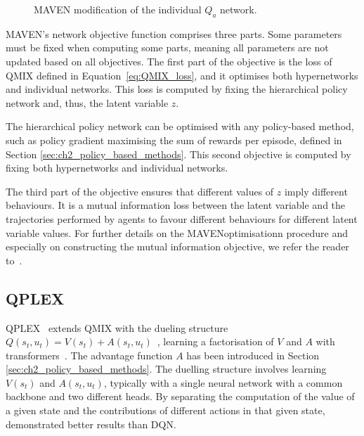 \begin{figure}
\centering

\caption{MAVEN modification of the individual $Q_a$ network.}
\label{fig:maven}
\end{figure}

MAVEN's network objective function comprises three parts.
Some parameters must be fixed when computing some parts, meaning all parameters are not updated based on all objectives.
The first part of the objective is the loss of QMIX defined in Equation~\ref{eq:QMIX_loss}, and it optimises both hypernetworks and individual networks.
This loss is computed by fixing the hierarchical policy network and, thus, the latent variable $z$.

The hierarchical policy network can be optimised with any policy-based method, such as policy gradient maximising the sum of rewards per episode, defined in Section \ref{sec:ch2_policy_based_methods}.
This second objective is computed by fixing both hypernetworks and individual networks.

The third part of the objective ensures that different values of $z$ imply different behaviours. 
It is a mutual information loss between the latent variable and the trajectories performed by agents to favour different behaviours for different latent variable values.
For further details on the MAVENoptimisationn procedure and especially on constructing the mutual information objective, we refer the reader to~\cite{Mahajan2019MAVEN:Exploration}.

\subsection{QPLEX}
QPLEX~\citep{wang2021qplex} extends QMIX with the dueling structure $Q(s_t, u_t) = V(s_t) + A(s_t, u_t)$~\citep{wang2016dueling}, learning a factorisation of $V$ and $A$ with transformers~\citep{vaswani2017attention}.
The advantage function $A$ has been introduced in Section \ref{sec:ch2_policy_based_methods}.
The duelling structure involves learning $V(s_t)$ and $A(s_t, u_t)$, typically with a single neural network with a common backbone and two different heads.
By separating the computation of the value of a given state and the contributions of different actions in that given state,~\citet{wang2016dueling} demonstrated better results than DQN.

